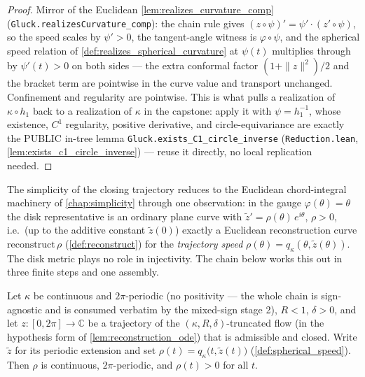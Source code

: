 \begin{proof}

\leanok
  Mirror of the Euclidean \cref{lem:realizes_curvature_comp}
  (\texttt{Gluck.realizesCurvature\_comp}): the chain rule gives
  $(z\circ\psi)'=\psi'\cdot(z'\circ\psi)$, so the speed scales by $\psi'>0$, the
  tangent-angle witness is $\varphi\circ\psi$, and the spherical speed relation of
  \cref{def:realizes_spherical_curvature} at $\psi(t)$ multiplies through by
  $\psi'(t)>0$ on both sides — the extra conformal factor $(1+\|z\|^2)/2$ and the
  bracket term are pointwise in the curve value and transport unchanged. Confinement and
  regularity are pointwise. This is what pulls a realization of $\kappa\circ h_1$ back
  to a realization of $\kappa$ in the capstone: apply it with $\psi=h_1^{-1}$, whose
  existence, $C^1$ regularity, positive derivative, and circle-equivariance are exactly
  the PUBLIC in-tree lemma \texttt{Gluck.exists\_C1\_circle\_inverse}
  (\texttt{Reduction.lean}, \cref{lem:exists_c1_circle_inverse}) — reuse it directly,
  no local replication needed.
\end{proof}

The simplicity of the closing trajectory reduces to the Euclidean chord-integral
machinery of \cref{chap:simplicity} through one observation: in the gauge
$\varphi(\theta)=\theta$ the disk representative is an ordinary plane curve with
$\tilde z'=\rho(\theta)\,e^{i\theta}$, $\rho>0$, i.e.\ (up to the additive constant
$\tilde z(0)$) exactly a Euclidean reconstruction curve
$\mathrm{reconstruct}\,\rho$ (\cref{def:reconstruct}) for the \emph{trajectory speed}
$\rho(\theta)=q_\kappa(\theta,\tilde z(\theta))$. The disk metric plays no role in
injectivity. The chain below works this out in three finite steps and one assembly.

\begin{lemma}
  \label{lem:spherical_trajectory_speed}
  Let $\kappa$ be continuous and $2\pi$-periodic (no positivity — the whole
  chain is sign-agnostic and is consumed verbatim by the mixed-sign stage 2),
  $R<1$, $\delta>0$, and let
  $z:[0,2\pi]\to\mathbb C$ be a trajectory of the $(\kappa,R,\delta)$-truncated flow
  (in the hypothesis form of \cref{lem:reconstruction_ode}) that is admissible and
  closed. Write $\tilde z$ for its periodic extension and set
  $\rho(t)=q_\kappa\bigl(t,\tilde z(t)\bigr)$
  (\cref{def:spherical_speed}). Then $\rho$ is continuous, $2\pi$-periodic, and
  $\rho(t)>0$ for all $t$.
\end{lemma}

